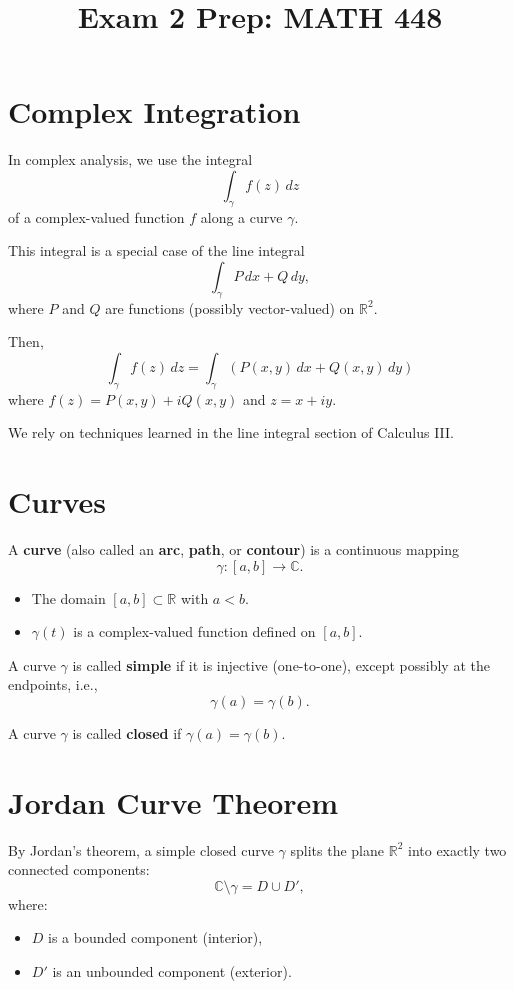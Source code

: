 \documentclass[12pt]{article}
\title{Exam 2 Prep: MATH 448}
\date{}
\theoremstyle{definition} %
\theoremstyle{plain} %
\begin{document}
\maketitle

\section*{Complex Integration}

In complex analysis, we use the integral
\[
\int_{\gamma} f(z)\,dz
\]
of a complex-valued function $f$ along a curve $\gamma$.

This integral is a special case of the line integral
\[
\int_{\gamma} P\,dx + Q\,dy,
\]
where $P$ and $Q$ are functions (possibly vector-valued) on $\mathbb{R}^2$.

Then,
\[
\int_{\gamma} f(z)\,dz = \int_{\gamma} (P(x,y)\,dx + Q(x,y)\,dy)
\]
where $f(z) = P(x,y) + iQ(x,y)$ and $z = x + iy$.

We rely on techniques learned in the line integral section of Calculus III.

\section*{Curves}

A \textbf{curve} (also called an \textbf{arc}, \textbf{path}, or \textbf{contour}) is a continuous mapping
\[
\gamma : [a, b] \to \mathbb{C}.
\]

\begin{itemize}
    \item The domain $[a, b] \subset \mathbb{R}$ with $a < b$.
    \item $\gamma(t)$ is a complex-valued function defined on $[a, b]$.
\end{itemize}

A curve $\gamma$ is called \textbf{simple} if it is injective (one-to-one), except possibly at the endpoints, i.e.,
\[
\gamma(a) = \gamma(b).
\]

A curve $\gamma$ is called \textbf{closed} if $\gamma(a) = \gamma(b)$.

\section*{Jordan Curve Theorem}

By Jordan’s theorem, a simple closed curve $\gamma$ splits the plane $\mathbb{R}^2$ into exactly two connected components:
\[
\mathbb{C} \setminus \gamma = D \cup D',
\]
where:
\begin{itemize}
    \item $D$ is a bounded component (interior),
    \item $D'$ is an unbounded component (exterior).
\end{itemize}
\end{document}
